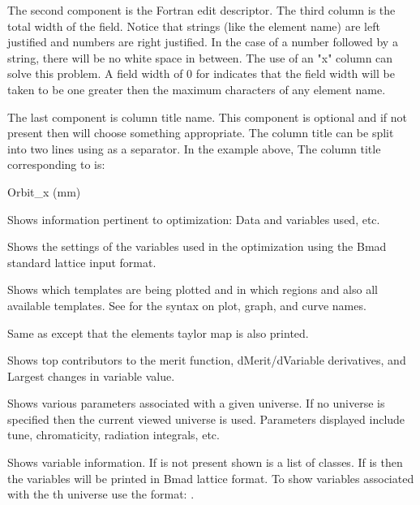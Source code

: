 {{\begin{description}
The second component is the Fortran edit descriptor. The third column
is the total width of the field. Notice that strings (like the element
name) are left justified and numbers are right justified. In the case
of a number followed by a string, there will be no white space in
between. The use of an "x" column can solve this problem. A field width
of 0 for  indicates that the field width will be taken to be
one greater then the maximum characters of any element name.

The last component is column title name. This component is optional
and if not present then \tao will choose something appropriate. The
column title can be split into two lines using  as a separator.
In the example above, The column title corresponding to  
is:
\begin{example}
  Orbit_x
   (mm)
\end{example}

  \item[show optimizer]
Shows information pertinent to optimization: Data and variables used, etc.

  \item[show opt\_vars]
Shows the settings of the variables used in the optimization using the 
Bmad standard lattice input format.

  \item[show plot]
Shows which templates are being plotted and in which regions and also all
available templates. See  for the syntax on plot, graph, and
curve names.

  \item[show taylor]
Same as  except that the elements taylor map is also printed.

  \item[show top10]
Shows top contributors to the merit function, dMerit/dVariable
derivatives, and Largest changes in variable value.

  \item[show universe]
Shows various parameters associated with a given universe. If no
universe is specified then the current viewed universe is
used. Parameters displayed include tune, chromaticity, radiation
integrals, etc.

  \item[show variable]
Shows variable information. If   is not
present shown is a list of  classes. If  is
\vn{*} then the variables will be printed in Bmad lattice format.
To show variables associated with the th universe use
the format: .


\end{description}}}

